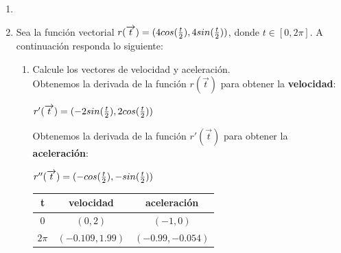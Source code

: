 \documentclass[10pt,letterpaper,fleqn]{article}
\begin{document}
    \begin{enumerate}
        \item 

        \item Sea la función vectorial $r (\overrightarrow{t}) = (4cos({t \over 2}),4sin({t \over 2}))$, donde $t \in [0,2\pi]$. A continuación responda lo siguiente:
        \begin{enumerate}
            \item Calcule los vectores de velocidad y aceleración.
            \\ Obtenemos la derivada de la función  $r (\overrightarrow{t})$ para obtener la {\bf velocidad}: 
            \begin{center}
                $r'(\overrightarrow{t}) = (-2sin({t \over 2}),2cos({t \over 2}))$ 
            \end{center}

            Obtenemos la derivada de la función $r'(\overrightarrow{t})$ para obtener la {\bf aceleración}:
            \begin{center}
                $r''(\overrightarrow{t}) = (-cos({t \over 2}),-sin({t \over 2}))$ \\
                \begin{tabular}{|c|c|c|} \hline 
                    t & velocidad & aceleración \\ \hline
                    $0$ & $(0,2) $ & $(-1,0)$  \\ \hline
                    $2\pi$ & $(-0.109,1.99)$ & $(-0.99,-0.054)$  \\ \hline
                \end{tabular}
            \end{center}


\end{enumerate}
\end{enumerate}
\end{document}
